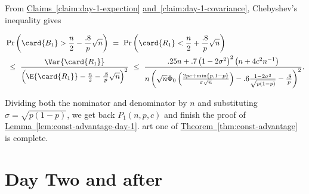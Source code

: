 \documentclass[11pt]{article}
\numberwithin{equation}{section}
\theoremstyle{definition}
\theoremstyle{plain}
\newcommand{\expref}[2]{\hyperref[#2]{#1~\ref{#2}}}
\begin{document}
			
			\noindent From \expref{Claims}{claim:day-1-expection} \expref{and}{claim:day-1-covariance}, %
			Chebyshev's inequality gives
			\begin{linenomath}\begin{equation*} \label{eq:chebyshev-R1-bound}
					\begin{aligned}
						& \Pr \left(\card{B_1} > \frac{n}{2} - \frac{.8}{p}\sqrt{n} \right)
						\ = \ \Pr \left(\card{R_1} < \frac{n}{2} + \frac{.8}{p}\sqrt{n} \right) \\
						& \ \le \ \frac{\Var{\card{R_1}}}{\left(\E{\card{R_1}} - \frac{n}{2} - \frac{.8}{p}\sqrt{n}\right)^2}
						\ \le \ \frac{.25n + .7\left(1 - 2\sigma^2\right)^2 \left(n + 4c^2n^{-1}\right)}
						{n\left(\sqrt{n}\Phi_0\left(\frac{2pc  %
								+ \min\{p, 1 - p\}  %
							}{\sigma\sqrt{n}}\right) - .6\frac{1 - 2\sigma^2}{\sqrt{p(1 - p)}} - \frac{.8}{p} \right)^2}.
					\end{aligned}
			\end{equation*}\end{linenomath}
			Dividing both the nominator and denominator by $n$ and substituting $\sigma = \sqrt{p(1 - p)}$, we get back $P_1(n, p, c)$ and finish
			the proof of \expref{Lemma}{lem:const-advantage-day-1}.
			art one of \expref{Theorem}{thm:const-advantage} is complete.
			
			\section{Day Two and after} \label{sec:universal-win}
			
\end{document}
